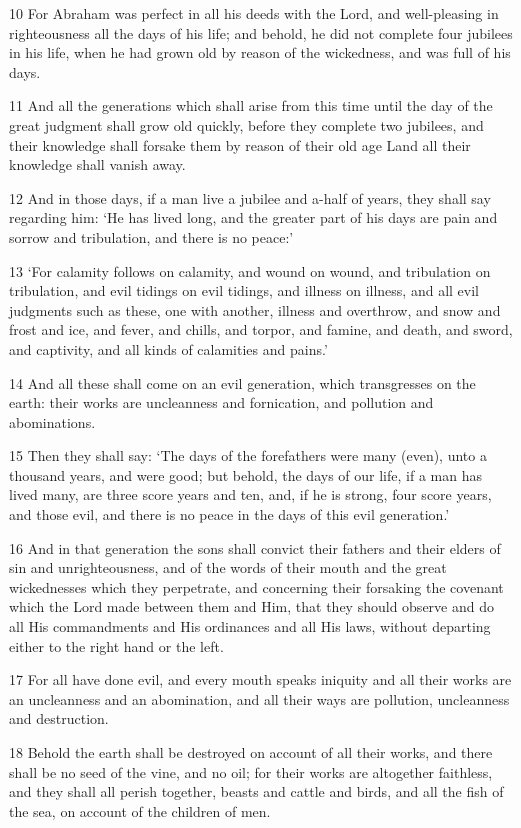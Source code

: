 \par 10 For Abraham was perfect in all his deeds with the Lord, and well-pleasing in righteousness all the days of his life; and behold, he did not complete four jubilees in his life, when he had grown old by reason of the wickedness, and was full of his days.
\par 11 And all the generations which shall arise from this time until the day of the great judgment shall grow old quickly, before they complete two jubilees, and their knowledge shall forsake them by reason of their old age Land all their knowledge shall vanish away.
\par 12 And in those days, if a man live a jubilee and a-half of years, they shall say regarding him: ‘He has lived long, and the greater part of his days are pain and sorrow and tribulation, and there is no peace:’
\par 13 ‘For calamity follows on calamity, and wound on wound, and tribulation on tribulation, and evil tidings on evil tidings, and illness on illness, and all evil judgments such as these, one with another, illness and overthrow, and snow and frost and ice, and fever, and chills, and torpor, and famine, and death, and sword, and captivity, and all kinds of calamities and pains.’
\par 14 And all these shall come on an evil generation, which transgresses on the earth: their works are uncleanness and fornication, and pollution and abominations.
\par 15 Then they shall say: ‘The days of the forefathers were many (even), unto a thousand years, and were good; but behold, the days of our life, if a man has lived many, are three score years and ten, and, if he is strong, four score years, and those evil, and there is no peace in the days of this evil generation.’
\par 16 And in that generation the sons shall convict their fathers and their elders of sin and unrighteousness, and of the words of their mouth and the great wickednesses which they perpetrate, and concerning their forsaking the covenant which the Lord made between them and Him, that they should observe and do all His commandments and His ordinances and all His laws, without departing either to the right hand or the left.
\par 17 For all have done evil, and every mouth speaks iniquity and all their works are an uncleanness and an abomination, and all their ways are pollution, uncleanness and destruction.
\par 18 Behold the earth shall be destroyed on account of all their works, and there shall be no seed of the vine, and no oil; for their works are altogether faithless, and they shall all perish together, beasts and cattle and birds, and all the fish of the sea, on account of the children of men.
